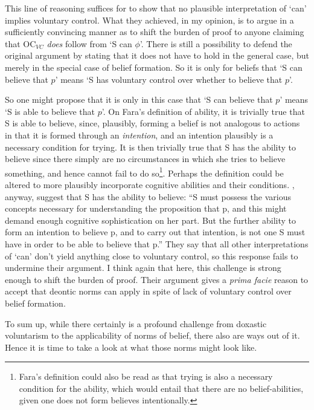 \documentclass[12pt,numbers=noenddot]{scrartcl}
\begin{document}
This line of reasoning suffices for \textcite[618]{Chuard2009-CHUENW} to show that no plausible interpretation of ‘can’ implies voluntary control. What they achieved, in my opinion, is to argue in a sufficiently convincing manner as to shift the burden of proof to anyone claiming that OC$_{VC}$ \emph{does} follow from ‘S can $\phi$’. There is still a possibility to defend the original argument by stating that it does not have to hold in the general case, but merely in the special case of belief formation. So it is only for beliefs that ‘S can believe that $p$’ means ‘S has voluntary control over whether to believe that $p$’.

So one might propose that it is only in this case that ‘S can believe that $p$’ means ‘S is able to believe that $p$’. On Fara's definition of ability, it is trivially true that S is able to believe, since, plausibly, forming a belief is not analogous to actions in that it is formed through an \emph{intention}, and an intention plausibly is a necessary condition for trying. It is then trivially true that S has the ability to believe since there simply are no circumstances in which she tries to believe something, and hence cannot fail to do so\footnote{Fara's definition could also be read as that trying is also a necessary condition for the ability, which would entail that there are no belief-abilities, given one does not form believes intentionally.}. Perhaps the definition could be altered to more plausibly incorporate cognitive abilities and their conditions. \textcite[618]{Chuard2009-CHUENW}, anyway, suggest that S has the ability to believe: “S must possess the various concepts necessary for understanding the proposition that p, and this might demand enough cognitive sophistication on her part. But the further ability to form an intention to believe p, and to carry out that intention, is not one S must have in order to be able to believe that p.” They say that all other interpretations of ‘can’ don't yield anything close to voluntary control, so this response fails to undermine their argument. I think again that here, this challenge is strong enough to shift the burden of proof. Their argument gives a \emph{prima facie} reason to accept that deontic norms can apply in spite of lack of voluntary control over belief formation.

To sum up, while there certainly is a profound challenge from doxastic voluntarism to the applicability of norms of belief, there also are ways out of it. Hence it is time to take a look at what those norms might look like.
\end{document}
